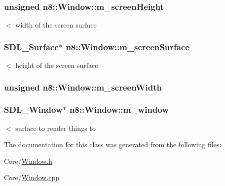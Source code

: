 \hypertarget{classn8_1_1_window_a7a1bc0ad691db2677c94330f743f0915}{
\subsubsection[{m\-\_\-screen\-Height}]{\setlength{\rightskip}{0pt plus 5cm}unsigned n8\-::\-Window\-::m\-\_\-screen\-Height\hspace{0.3cm}{\ttfamily [private]}}}\label{classn8_1_1_window_a7a1bc0ad691db2677c94330f743f0915}
$<$ width of the screen surface \hypertarget{classn8_1_1_window_a9ba324f2cc04e8183fd9b938dc730222}{
\subsubsection[{m\-\_\-screen\-Surface}]{\setlength{\rightskip}{0pt plus 5cm}S\-D\-L\-\_\-\-Surface$\ast$ n8\-::\-Window\-::m\-\_\-screen\-Surface\hspace{0.3cm}{\ttfamily [private]}}}\label{classn8_1_1_window_a9ba324f2cc04e8183fd9b938dc730222}
$<$ height of the screen surface \hypertarget{classn8_1_1_window_acb7bbe7407c00a0f14b5d0a1a42694d8}{
\subsubsection[{m\-\_\-screen\-Width}]{\setlength{\rightskip}{0pt plus 5cm}unsigned n8\-::\-Window\-::m\-\_\-screen\-Width\hspace{0.3cm}{\ttfamily [private]}}}\label{classn8_1_1_window_acb7bbe7407c00a0f14b5d0a1a42694d8}
\hypertarget{classn8_1_1_window_ae658f6f3a5aefdde5b699b65fc4337e3}{
\subsubsection[{m\-\_\-window}]{\setlength{\rightskip}{0pt plus 5cm}S\-D\-L\-\_\-\-Window$\ast$ n8\-::\-Window\-::m\-\_\-window\hspace{0.3cm}{\ttfamily [private]}}}\label{classn8_1_1_window_ae658f6f3a5aefdde5b699b65fc4337e3}
$<$ surface to render things to 

The documentation for this class was generated from the following files\-:\begin{DoxyCompactItemize}
\item 
Core/\hyperlink{_window_8h}{Window.\-h}\item 
Core/\hyperlink{_window_8cpp}{Window.\-cpp}\end{DoxyCompactItemize}
